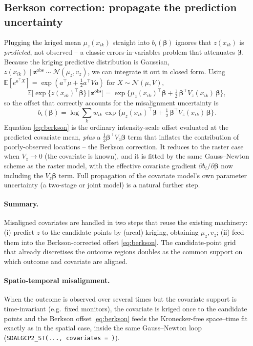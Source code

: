 \documentclass[11pt]{article}
\newcommand{\bet}{{\bm{\beta}}}
\newcommand{\E}{\mathbb{E}}
\newcommand{\N}{\mathcal{N}}
\begin{document}
\subsection{Berkson correction: propagate the prediction uncertainty}
Plugging the kriged mean $\mu_z(x_{ik})$ straight into $b_i(\bet)$ ignores that
$z(x_{ik})$ is \emph{predicted}, not observed -- a classic errors-in-variables
problem that attenuates $\bet$. Because the kriging predictive distribution is
Gaussian, $z(x_{ik})\mid\mathbf z^{\mathrm{obs}}\sim\N(\mu_z,v_z)$, we can integrate
it out in closed form. Using $\E[e^{a^\top X}]=\exp(a^\top\mu+\tfrac12 a^\top V a)$
for $X\sim\N(\mu,V)$,
\begin{equation}
\E\big[\exp\{z(x_{ik})^\top\bet\}\,\big|\,\mathbf z^{\mathrm{obs}}\big]
=\exp\!\Big\{\mu_z(x_{ik})^\top\bet+\tfrac12\,\bet^\top V_z(x_{ik})\,\bet\Big\},
\end{equation}
so the offset that correctly accounts for the misalignment uncertainty is
\begin{equation}
\boxed{\;
b_i(\bet)=\log\sum_k w_{ik}\,
\exp\!\Big\{\mu_z(x_{ik})^\top\bet+\tfrac12\,\bet^\top V_z(x_{ik})\,\bet\Big\}.\;}
\label{eq:berkson}
\end{equation}
Equation \eqref{eq:berkson} is the ordinary intensity-scale offset evaluated at the
predicted covariate mean, \emph{plus} a $\tfrac12\bet^\top V_z\bet$ term that inflates
the contribution of poorly-observed locations -- the Berkson correction. It reduces
to the raster case when $V_z\to 0$ (the covariate is known), and it is fitted by
the same Gauss--Newton scheme as the raster model, with the effective covariate
gradient $\partial b_i/\partial\bet$ now including the $V_z\bet$ term. Full
propagation of the covariate model's own parameter uncertainty (a two-stage or
joint model) is a natural further step.

\paragraph{Summary.} Misaligned covariates are handled in two steps that reuse the
existing machinery: (i) predict $z$ to the candidate points by (areal) kriging,
obtaining $\mu_z,v_z$; (ii) feed them into the Berkson-corrected offset
\eqref{eq:berkson}. The candidate-point grid that already discretises the outcome
regions doubles as the common support on which outcome and covariate are aligned.

\paragraph{Spatio-temporal misalignment.} When the outcome is observed over several
times but the covariate support is time-invariant (e.g.\ fixed monitors), the
covariate is kriged once to the candidate points and the Berkson offset
\eqref{eq:berkson} feeds the Kronecker-free space--time fit exactly as in the
spatial case, inside the same Gauss--Newton loop
(\texttt{SDALGCP2\_ST(..., covariates = )}).
\end{document}
